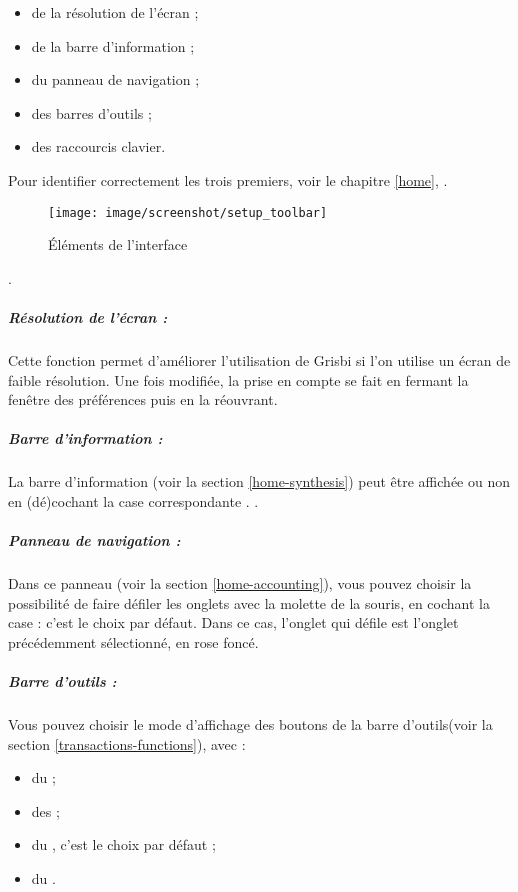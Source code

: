 \begin{itemize}
	\item de la résolution de l'écran ;
	\item de la barre d'information ;
	\item du panneau de navigation ;
	\item des barres d'outils ;
	\item des raccourcis clavier.
\end{itemize}

Pour identifier correctement les trois premiers, voir le chapitre \vref{home},  \ifIllustration {}.
\begin{figure}[htbp]
\begin{center}
\texttt{[image: image/screenshot/setup\_toolbar]}
\end{center}
\caption{Éléments de l'interface}
\label{setup-toolbar-img}
\end{figure}
\else .
\fi

\subparagraph{Résolution de l'écran :}

Cette fonction permet d'améliorer l'utilisation de Grisbi si l'on utilise un écran de faible résolution. Une fois modifiée, la prise en compte se fait en fermant la fenêtre des préférences puis en la réouvrant.



\subparagraph{Barre d'information :}

La barre d'information (voir la section \vref{home-synthesis}) peut être affichée ou non en (dé)cochant la case correspondante . .

\subparagraph{Panneau de navigation :}

Dans ce panneau  (voir la section \vref{home-accounting}), vous pouvez choisir la possibilité de faire défiler les onglets avec la molette de la souris, en cochant la case  : c'est le choix par défaut. Dans ce cas, l'onglet qui défile est l'onglet précédemment sélectionné, en rose foncé{\couleur}.


\subparagraph{Barre d'outils :}

Vous pouvez choisir le mode d'affichage des boutons de la barre d'outils(voir la section \vref{transactions-functions}), avec :
\begin{itemize}
	\item du  ;
	\item des  ;
	\item du , c'est le choix par défaut ;
	\item du .
\end{itemize}




